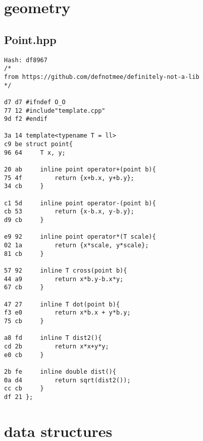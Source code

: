 \documentclass[11pt, a4paper, twoside]{article}
\begin{document}
%
%

\section{geometry}

\subsection{Point.hpp}
\begin{lstlisting}
Hash: df8967
/*
from https://github.com/defnotmee/definitely-not-a-lib
*/

d7 d7 #ifndef O_O
77 12 #include"template.cpp"
9d f2 #endif

3a 14 template<typename T = ll>
c9 be struct point{
96 64     T x, y;
      
20 ab     inline point operator+(point b){
75 4f         return {x+b.x, y+b.y};
34 cb     }
      
c1 5d     inline point operator-(point b){
cb 53         return {x-b.x, y-b.y};
d9 cb     }
      
e9 92     inline point operator*(T scale){
02 1a         return {x*scale, y*scale};
81 cb     }
      
57 92     inline T cross(point b){
44 a9         return x*b.y-b.x*y;
67 cb     }
      
47 27     inline T dot(point b){
f3 e0         return x*b.x + y*b.y;
75 cb     }
      
a8 fd     inline T dist2(){
cd 2b         return x*x+y*y;
e0 cb     }
      
2b fe     inline double dist(){
0a d4         return sqrt(dist2());
cc cb     }
df 21 };
\end{lstlisting}



%
%

\section{data structures}
\end{document}
